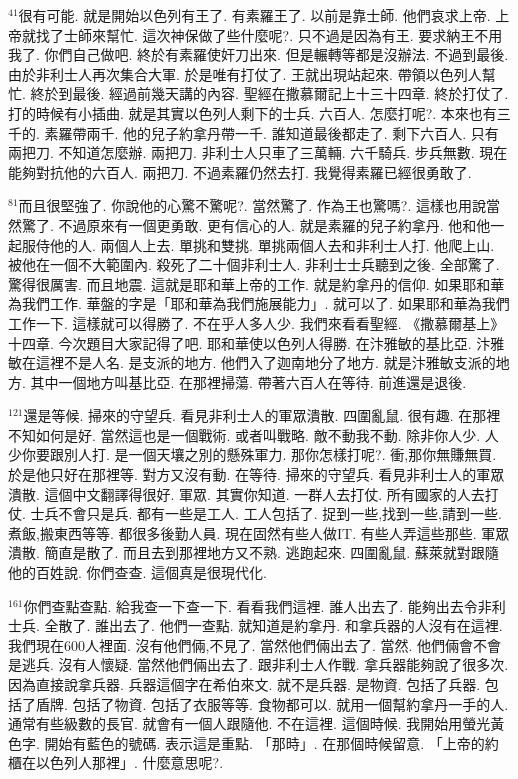 \documentclass{book}
\begin{document}
$^{41}$很有可能.
就是開始以色列有王了.
有素羅王了.
以前是靠士師.
他們哀求上帝.
上帝就找了士師來幫忙.
這次神保做了些什麼呢?.
只不過是因為有王.
要求納王不用我了.
你們自己做吧.
終於有素羅使奸刀出來.
但是輾轉等都是沒辦法.
不過到最後.
由於非利士人再次集合大軍.
於是唯有打仗了.
王就出現站起來.
帶領以色列人幫忙.
終於到最後.
經過前幾天講的內容.
聖經在撒慕爾記上十三十四章.
終於打仗了.
打的時候有小插曲.
就是其實以色列人剩下的士兵.
六百人.
怎麼打呢?.
本來也有三千的.
素羅帶兩千.
他的兒子約拿丹帶一千.
誰知道最後都走了.
剩下六百人.
只有兩把刀.
不知道怎麼辦.
兩把刀.
非利士人只車了三萬輛.
六千騎兵.
步兵無數.
現在能夠對抗他的六百人.
兩把刀.
不過素羅仍然去打.
我覺得素羅已經很勇敢了.

$^{81}$而且很堅強了.
你說他的心驚不驚呢?.
當然驚了.
作為王也驚嗎?.
這樣也用說當然驚了.
不過原來有一個更勇敢.
更有信心的人.
就是素羅的兒子約拿丹.
他和他一起服侍他的人.
兩個人上去.
單挑和雙挑.
單挑兩個人去和非利士人打.
他爬上山.
被他在一個不大範圍內.
殺死了二十個非利士人.
非利士士兵聽到之後.
全部驚了.
驚得很厲害.
而且地震.
這就是耶和華上帝的工作.
就是約拿丹的信仰.
如果耶和華為我們工作.
華盤的字是「耶和華為我們施展能力」.
就可以了.
如果耶和華為我們工作一下.
這樣就可以得勝了.
不在乎人多人少.
我們來看看聖經.
《撒慕爾基上》十四章.
今次題目大家記得了吧.
耶和華使以色列人得勝.
在汴雅敏的基比亞.
汴雅敏在這裡不是人名.
是支派的地方.
他們入了迦南地分了地方.
就是汴雅敏支派的地方.
其中一個地方叫基比亞.
在那裡掃蕩.
帶著六百人在等待.
前進還是退後.

$^{121}$還是等候.
掃來的守望兵.
看見非利士人的軍眾潰散.
四圍亂鼠.
很有趣.
在那裡不知如何是好.
當然這也是一個戰術.
或者叫戰略.
敵不動我不動.
除非你人少.
人少你要跟別人打.
是一個天壤之別的懸殊軍力.
那你怎樣打呢?.
衝,那你無賺無買.
於是他只好在那裡等.
對方又沒有動.
在等待.
掃來的守望兵.
看見非利士人的軍眾潰散.
這個中文翻譯得很好.
軍眾.
其實你知道.
一群人去打仗.
所有國家的人去打仗.
士兵不會只是兵.
都有一些是工人.
工人包括了.
捉到一些,找到一些,請到一些.
煮飯,搬東西等等.
都很多後勤人員.
現在固然有些人做IT.
有些人弄這些那些.
軍眾潰散.
簡直是散了.
而且去到那裡地方又不熟.
逃跑起來.
四圍亂鼠.
蘇萊就對跟隨他的百姓說.
你們查查.
這個真是很現代化.

$^{161}$你們查點查點.
給我查一下查一下.
看看我們這裡.
誰人出去了.
能夠出去令非利士兵.
全散了.
誰出去了.
他們一查點.
就知道是約拿丹.
和拿兵器的人沒有在這裡.
我們現在600人裡面.
沒有他們倆,不見了.
當然他們倆出去了.
當然.
他們倆會不會是逃兵.
沒有人懷疑.
當然他們倆出去了.
跟非利士人作戰.
拿兵器能夠說了很多次.
因為直接說拿兵器.
兵器這個字在希伯來文.
就不是兵器.
是物資.
包括了兵器.
包括了盾牌.
包括了物資.
包括了衣服等等.
食物都可以.
就用一個幫約拿丹一手的人.
通常有些級數的長官.
就會有一個人跟隨他.
不在這裡.
這個時候.
我開始用螢光黃色字.
開始有藍色的號碼.
表示這是重點.
「那時」.
在那個時候留意.
「上帝的約櫃在以色列人那裡」.
什麼意思呢?.
\end{document}
